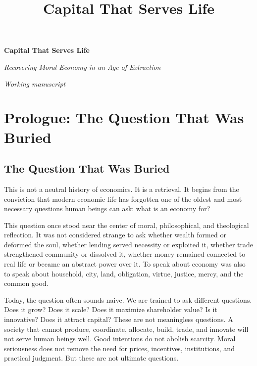 \documentclass[11pt,a4paper,oneside]{book}
\title{Capital That Serves Life}
\author{}
\date{}
\begin{document}
\begin{titlepage}
  \centering
  \vspace*{0.32\textheight}
  {\Huge\bfseries Capital That Serves Life\par}
  \vspace{1.2em}
  {\Large\itshape Recovering Moral Economy in an Age of Extraction\par}
  \vspace{2em}
  {\large\itshape Working manuscript\par}
  \vfill
\end{titlepage}

\frontmatter
\pagestyle{plain}
\tableofcontents
\clearpage

\mainmatter

\chapter*{Prologue: The Question That Was Buried}
\section*{The Question That Was Buried}

This is not a neutral history of economics. It is a retrieval. It begins from the conviction that modern economic life has forgotten one of the oldest and most necessary questions human beings can ask: what is an economy for?

This question once stood near the center of moral, philosophical, and theological reflection. It was not considered strange to ask whether wealth formed or deformed the soul, whether lending served necessity or exploited it, whether trade strengthened community or dissolved it, whether money remained connected to real life or became an abstract power over it. To speak about economy was also to speak about household, city, land, obligation, virtue, justice, mercy, and the common good.

Today, the question often sounds naive. We are trained to ask different questions. Does it grow? Does it scale? Does it maximize shareholder value? Is it innovative? Does it attract capital? These are not meaningless questions. A society that cannot produce, coordinate, allocate, build, trade, and innovate will not serve human beings well. Good intentions do not abolish scarcity. Moral seriousness does not remove the need for prices, incentives, institutions, and practical judgment. But these are not ultimate questions.
\end{document}
